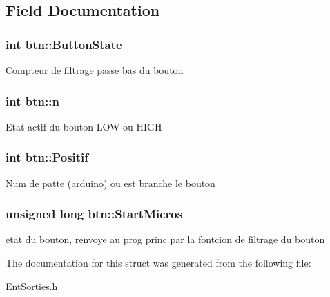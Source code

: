 \subsection{Field Documentation}
\hypertarget{structbtn_a24d7bca6e4bf616c6967cec7c2b4dc3d}{
\subsubsection[{ButtonState}]{\setlength{\rightskip}{0pt plus 5cm}int {\bf btn::ButtonState}}}
\label{structbtn_a24d7bca6e4bf616c6967cec7c2b4dc3d}
Compteur de filtrage passe bas du bouton \hypertarget{structbtn_ad9e4b266624b0c71e42c0b41df8a7efa}{
\subsubsection[{n}]{\setlength{\rightskip}{0pt plus 5cm}int {\bf btn::n}}}
\label{structbtn_ad9e4b266624b0c71e42c0b41df8a7efa}
Etat actif du bouton LOW ou HIGH \hypertarget{structbtn_a615f75574814cdcb377ea3db29cbccea}{
\subsubsection[{Positif}]{\setlength{\rightskip}{0pt plus 5cm}int {\bf btn::Positif}}}
\label{structbtn_a615f75574814cdcb377ea3db29cbccea}
Num de patte (arduino) ou est branche le bouton \hypertarget{structbtn_a92a5840b5ed25eec3b9f9b58e19c555d}{
\subsubsection[{StartMicros}]{\setlength{\rightskip}{0pt plus 5cm}unsigned long {\bf btn::StartMicros}}}
\label{structbtn_a92a5840b5ed25eec3b9f9b58e19c555d}
etat du bouton, renvoye au prog princ par la fontcion de filtrage du bouton 

The documentation for this struct was generated from the following file:\begin{DoxyCompactItemize}
\item 
\hyperlink{EntSorties_8h}{EntSorties.h}\end{DoxyCompactItemize}
